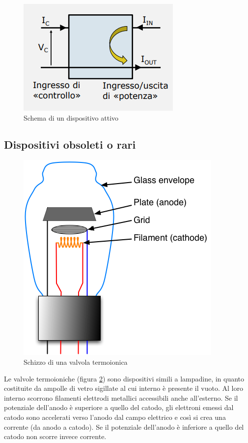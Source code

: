\documentclass{article}
\begin{document}
\begin{figure}[h]
  \centering
  \includegraphics[scale=0.6]{IM_dispositivo_attivo_base}
  \caption{Schema di un dispositivo attivo}
  \label{Schema_dispositivo_attivo_base}
\end{figure}

\subsection{Dispositivi obsoleti o rari}

\begin{figure}[h]
  \centering
  \includegraphics[scale=0.35]{Triode_vacuum_tube}
  \caption{Schizzo di una valvola termoionica}
  \label{Triode_vacuum_tube}
\end{figure}

Le valvole termoioniche (figura \ref{Triode_vacuum_tube}) sono dispositivi simili a lampadine, in quanto costituite da ampolle di vetro sigillate al cui interno è presente il vuoto. Al loro interno scorrono filamenti elettrodi metallici accessibili anche all'esterno. Se il potenziale dell’anodo è superiore a quello del catodo, gli elettroni emessi dal catodo sono accelerati verso l’anodo dal campo elettrico e così si crea una corrente (da anodo a catodo). Se il potenziale dell’anodo è inferiore a quello del catodo non scorre invece corrente.
\end{document}
